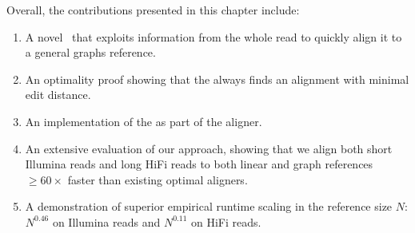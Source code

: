 Overall, the contributions presented in this chapter include:
\begin{enumerate}
    \item A novel \A~\seedh that exploits information from the whole read to
    quickly align it to a general graphs reference.
    \item An optimality proof showing that the \seedh always finds an alignment
    with minimal edit distance.
	\item An implementation of the \seedh as part of the \astarix aligner.
    \item An extensive evaluation of our approach, showing that we align both
    short Illumina reads and long HiFi reads to both linear and graph references
    $\geq 60 \times$ faster than existing optimal aligners.
    \item A demonstration of superior empirical runtime scaling in the reference
    size $N$: $N^{0.46}$ on Illumina reads and $N^{0.11}$ on HiFi reads.
\end{enumerate}

